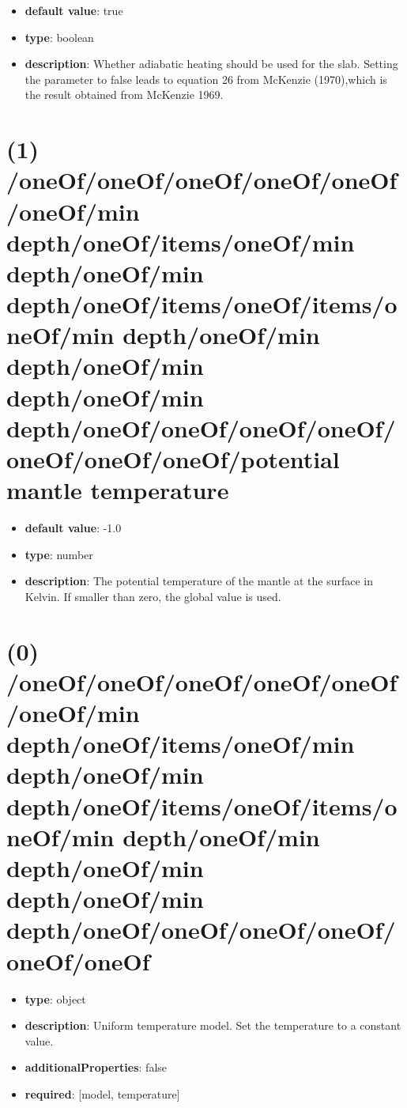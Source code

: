 \begin{itemize}[leftmargin=1em]\item {\bf default value}: true
\item {\bf type}: boolean
\item {\bf description}: Whether adiabatic heating should be used for the slab. Setting the parameter to false leads to equation 26 from McKenzie (1970),which is the result obtained from McKenzie 1969.
\end{itemize}\section{(1) /oneOf/oneOf/oneOf/oneOf/oneOf/oneOf/min depth/oneOf/items/oneOf/min depth/oneOf/min depth/oneOf/items/oneOf/items/oneOf/min depth/oneOf/min depth/oneOf/min depth/oneOf/min depth/oneOf/oneOf/oneOf/oneOf/oneOf/oneOf/oneOf/potential mantle temperature}
\begin{itemize}[leftmargin=1em]\item {\bf default value}: -1.0
\item {\bf type}: number
\item {\bf description}: The potential temperature of the mantle at the surface in Kelvin. If smaller than zero, the global value is used.
\end{itemize}\section{(0) /oneOf/oneOf/oneOf/oneOf/oneOf/oneOf/min depth/oneOf/items/oneOf/min depth/oneOf/min depth/oneOf/items/oneOf/items/oneOf/min depth/oneOf/min depth/oneOf/min depth/oneOf/min depth/oneOf/oneOf/oneOf/oneOf/oneOf/oneOf}
\begin{itemize}[leftmargin=0em]\item {\bf type}: object
\item {\bf description}: Uniform temperature model. Set the temperature to a constant value.
\item {\bf additionalProperties}: false
\item {\bf required}: [model, temperature]\end{itemize}
